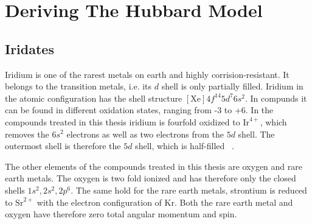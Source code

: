   

\chapter{Deriving The Hubbard Model}

\section{Iridates}
Iridium is one of the rarest metals on earth and highly corrision-resistant. 
It belongs to the transition metals, i.e. its $d$ shell is only partially filled.  
Iridium in the atomic configuration has the shell structure $[\mathrm{Xe}]4f^{14}5d^7 6s^2$.
In compunds it can be found in different oxidation states, ranging from -3 to +6.
In the compounds treated in this thesis iridium is fourfold oxidized to $\mathrm{Ir}^{4+}$, 
which removes the $6s^2$ electrons as well as two electrons from the $5d$ shell.
The outermost shell is therefore the $5d$ shell, which is half-filled ~\cite{Abragam70}.



The other elements of the compounds treated in this thesis are oxygen and rare earth metals. 
The oxygen is two fold ionized and has therefore only the closed shells $1s^2,2s^2,2p^6$.
The same hold for the rare earth metals, strontium is reduced to 
$\mathrm{Sr}^{2+}$ with the electron configuration of $\mathrm{Kr}$. 
Both the rare earth metal and oxygen have therefore zero total angular momentum and spin. 

